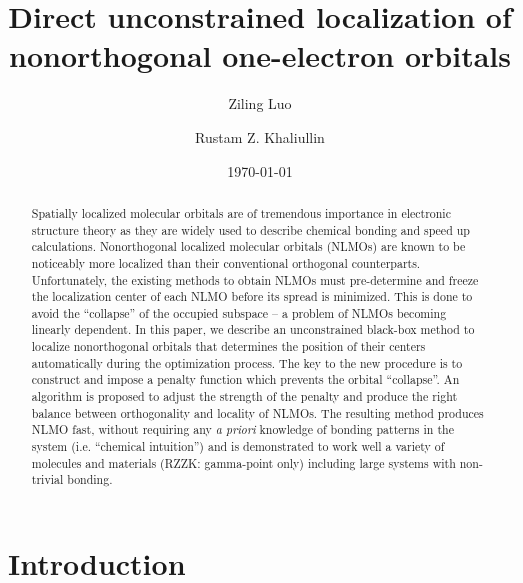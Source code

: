 \documentclass[aps,prl,reprint,amsmath,amssymb]{revtex4-1}
\begin{document}



\title{
Direct unconstrained localization of nonorthogonal one-electron orbitals
}

\author{Ziling Luo}
\author{Rustam Z. Khaliullin}

\date{\today}

\begin{abstract}
Spatially localized molecular orbitals are of tremendous importance in electronic structure theory as they are widely used to describe chemical bonding and speed up calculations.
Nonorthogonal localized molecular orbitals (NLMOs) are known to be noticeably more localized than their conventional orthogonal counterparts. 
Unfortunately, the existing methods to obtain NLMOs must pre-determine and freeze the localization center of each NLMO before its spread is minimized. 
This is done to avoid the ``collapse'' of the occupied subspace – a problem of NLMOs becoming linearly dependent. 
In this paper, we describe an unconstrained black-box method to localize nonorthogonal orbitals that determines the position of their centers automatically during the optimization process. 
The key to the new procedure is to construct and impose a penalty function which prevents the orbital ``collapse''. 
An algorithm is proposed to adjust the strength of the penalty and produce the right balance between orthogonality and locality of NLMOs. 
The resulting method produces NLMO fast, without requiring any \emph{a priori} knowledge of bonding patterns in the system (i.e. ``chemical intuition'') and is demonstrated to work well a variety of molecules and materials (RZZK: gamma-point only) including large systems with non-trivial bonding. 
\end{abstract}


\maketitle

\section{Introduction} 

\end{document}
